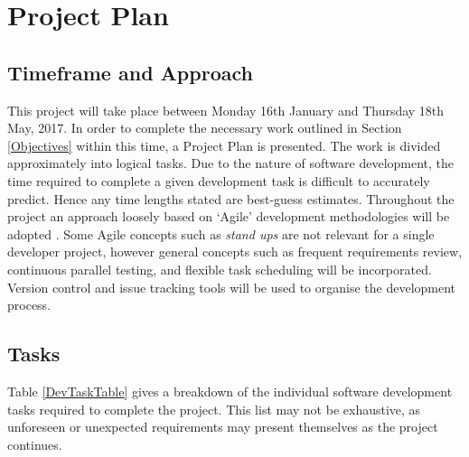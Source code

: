 \documentclass[hidelinks,10pt]{article}
\begin{document}
\section{Project Plan}
\subsection{Timeframe and Approach}
This project will take place between Monday 16th January and Thursday 18th May, 2017. In order to complete the necessary work outlined in Section \ref{Objectives} within this time, a Project Plan is presented. The work is divided approximately into logical tasks.  Due to the nature of software development, the time required to complete a given development task is difficult to accurately predict. Hence any time lengths stated are best-guess estimates. Throughout the project an approach loosely based on `Agile' development methodologies will be adopted \cite{Agile}. Some Agile concepts such as \textit{stand ups} are not relevant for a single developer project, however general concepts such as frequent requirements review, continuous parallel testing, and flexible task scheduling will be incorporated. Version control and issue tracking tools will be used to organise the development process.

\subsection{Tasks}\label{Tasks}
Table \ref{DevTaskTable} gives a breakdown of the individual software development tasks required to complete the project. This list may not be exhaustive, as unforeseen or unexpected requirements may present themselves as the project continues.
\end{document}
